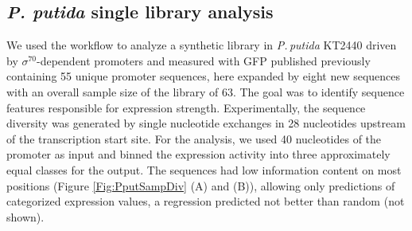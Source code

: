 \documentclass[utf8]{frontiersSCNS} %
\begin{document}

\subsection{\textit{P. putida} single library analysis}
We used the workflow to analyze a synthetic library in \textit{P.\,putida} KT2440 driven by $\sigma^{70}$-dependent promoters and measured with GFP published previously \citep{Kobbing2020} containing 55 unique promoter sequences, here expanded by eight new sequences with an overall sample size of the library of 63. The goal was to identify sequence features responsible for expression strength. Experimentally, the sequence diversity was generated by single nucleotide exchanges in 28 nucleotides upstream of the transcription start site. For the analysis, we used 40 nucleotides of the promoter as input and binned the expression activity into three approximately equal classes for the output. The sequences had low information content on most positions (Figure \ref{Fig:PputSampDiv} (A) and (B)), allowing only predictions of categorized expression values, a regression predicted not better than random (not shown).
\end{document}

